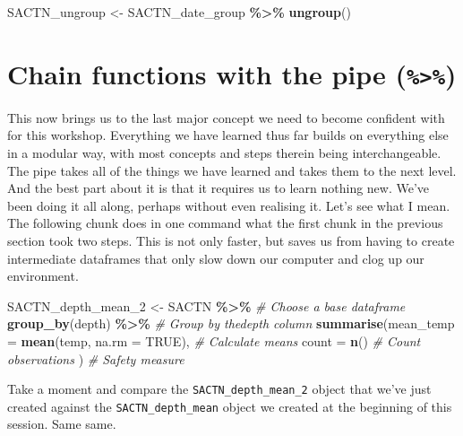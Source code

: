 \documentclass[
]{book}
\newenvironment{Shaded}{\begin{snugshade}}{\end{snugshade}}
\newcommand{\CommentTok}[1]{\textcolor[rgb]{0.56,0.35,0.01}{\textit{#1}}}
\newcommand{\DataTypeTok}[1]{\textcolor[rgb]{0.13,0.29,0.53}{#1}}
\newcommand{\DecValTok}[1]{\textcolor[rgb]{0.00,0.00,0.81}{#1}}
\newcommand{\KeywordTok}[1]{\textcolor[rgb]{0.13,0.29,0.53}{\textbf{#1}}}
\newcommand{\NormalTok}[1]{#1}
\newcommand{\OperatorTok}[1]{\textcolor[rgb]{0.81,0.36,0.00}{\textbf{#1}}}
\newcommand{\OtherTok}[1]{\textcolor[rgb]{0.56,0.35,0.01}{#1}}
\newcommand{\StringTok}[1]{\textcolor[rgb]{0.31,0.60,0.02}{#1}}
\begin{document}
\begin{Shaded}
\begin{Highlighting}[]
\NormalTok{SACTN\_ungroup <{-}}\StringTok{ }\NormalTok{SACTN\_date\_group }\OperatorTok{\%>\%}\StringTok{ }
\StringTok{  }\KeywordTok{ungroup}\NormalTok{()}
\end{Highlighting}
\end{Shaded}

\hypertarget{chain-functions-with-the-pipe}{%
\section{\texorpdfstring{Chain functions with the pipe (\texttt{\%\textgreater{}\%})}{Chain functions with the pipe (\%\textgreater\%)}}\label{chain-functions-with-the-pipe}}

This now brings us to the last major concept we need to become confident with for this workshop. Everything we have learned thus far builds on everything else in a modular way, with most concepts and steps therein being interchangeable. The pipe takes all of the things we have learned and takes them to the next level. And the best part about it is that it requires us to learn nothing new. We've been doing it all along, perhaps without even realising it. Let's see what I mean. The following chunk does in one command what the first chunk in the previous section took two steps. This is not only faster, but saves us from having to create intermediate dataframes that only slow down our computer and clog up our environment.

\begin{Shaded}
\begin{Highlighting}[]
\NormalTok{SACTN\_depth\_mean\_}\DecValTok{2}\NormalTok{ <{-}}\StringTok{ }\NormalTok{SACTN }\OperatorTok{\%>\%}\StringTok{ }\CommentTok{\# Choose a base dataframe}
\StringTok{  }\KeywordTok{group\_by}\NormalTok{(depth) }\OperatorTok{\%>\%}\StringTok{ }\CommentTok{\# Group by thedepth column}
\StringTok{  }\KeywordTok{summarise}\NormalTok{(}\DataTypeTok{mean\_temp =} \KeywordTok{mean}\NormalTok{(temp, }\DataTypeTok{na.rm =} \OtherTok{TRUE}\NormalTok{), }\CommentTok{\# Calculate means}
  \DataTypeTok{count =} \KeywordTok{n}\NormalTok{() }\CommentTok{\# Count observations}
\NormalTok{) }\CommentTok{\# Safety measure}
\end{Highlighting}
\end{Shaded}

Take a moment and compare the \texttt{SACTN\_depth\_mean\_2} object that we've just created against the \texttt{SACTN\_depth\_mean} object we created at the beginning of this session. Same same.
\end{document}
